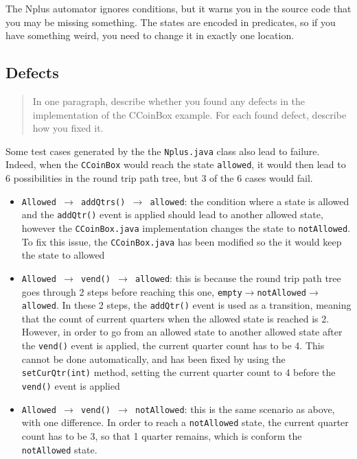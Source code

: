 \documentclass[ieee]{submit}
\begin{document}
The Nplus automator ignores conditions, but it warns you in the source code that you may be missing something. The states are encoded in predicates, so if you have something weird, you need to change it in exactly one location.

\subsection{Defects}

\begin{quote}
In one paragraph, describe whether you found any defects in the implementation of the CCoinBox example. For each found defect, describe how you fixed it.
\end{quote}

Some test cases generated by the the {\tt Nplus.java} class also lead to failure. Indeed, when the {\tt CCoinBox} would reach the state {\tt allowed}, it would then lead to 6 possibilities in the round trip path tree, but 3 of the 6 cases would fail.

\begin{itemize}
\item {\tt Allowed $\rightarrow$ addQtrs() $\rightarrow$ allowed}: the condition where a state is allowed and the {\tt addQtr()} event is applied should lead to another allowed state, however the {\tt CCoinBox.java} implementation changes the state to {\tt notAllowed}. To fix this issue, the {\tt CCoinBox.java} has been modified so the it would keep the state to allowed
\item {\tt Allowed $\rightarrow$ vend() $\rightarrow$ allowed}: this is because the round trip path tree goes through 2 steps before reaching this one, {\tt empty$\rightarrow$notAllowed$\rightarrow$allowed}. In these 2 steps, the {\tt addQtr()} event is used as a transition, meaning that the count of current quarters when the allowed state is reached is 2. However, in order to go from an allowed state to another allowed state after the {\tt vend()} event is applied, the current quarter count has to be 4. This cannot be done automatically, and has been fixed by using the {\tt setCurQtr(int)} method, setting the current quarter count to 4 before the {\tt vend()} event is applied
\item {\tt Allowed $\rightarrow$ vend() $\rightarrow$ notAllowed}: this is the same scenario as above, with one difference. In order to reach a {\tt notAllowed} state, the current quarter count has to be 3, so that 1 quarter remains, which is conform the {\tt notAllowed} state.
\end{itemize}
\end{document}
